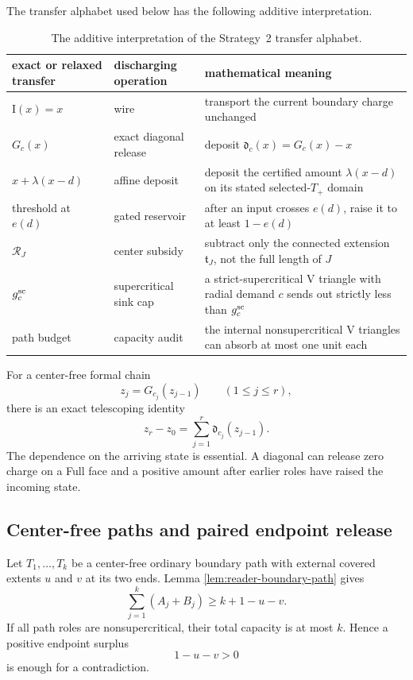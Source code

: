 The transfer alphabet used below has the following additive interpretation.
\begin{table}[H]
\centering
\scriptsize
\renewcommand{\arraystretch}{1.12}
\begin{tabular}{@{}p{}p{}p{}@{}}
\toprule
exact or relaxed transfer&discharging operation&mathematical meaning\\
\midrule
\(\mathrm I(x)=x\)&wire&transport the current boundary charge unchanged\\
\(G_c(x)\)&exact diagonal release&deposit \(\mathfrak d_c(x)=G_c(x)-x\)\\
\(x+\lambda(x-d)\)&affine deposit&deposit the certified amount
\(\lambda(x-d)\) on its stated selected-\(T_+\) domain\\
threshold at \(e(d)\)&gated reservoir&after an input crosses \(e(d)\), raise
it to at least \(1-e(d)\)\\
\(\mathcal R_J\)&center subsidy&subtract only the connected extension
\(\mathfrak t_J\), not the full length of \(J\)\\
\(g_c^{\rm sc}\)&supercritical sink cap&a strict-supercritical V triangle
with radial demand \(c\) sends out strictly less than \(g_c^{\rm sc}\)\\
path budget&capacity audit&the internal nonsupercritical V triangles can
absorb at most one unit each\\
\bottomrule
\end{tabular}
\caption{The additive interpretation of the Strategy~2 transfer alphabet.}
\label{tab:body-discharging-dictionary}
\end{table}

For a center-free formal chain
\[
 z_j=G_{c_j}(z_{j-1})
 \qquad(1\le j\le r),
\]
there is an exact telescoping identity
\begin{equation}
 z_r-z_0
 =\sum_{j=1}^r\mathfrak d_{c_j}(z_{j-1}).
 \label{eq:body-discharge-telescope}
\end{equation}
The dependence on the arriving state is essential.  A diagonal can release
zero charge on a Full face and a positive amount after earlier roles have
raised the incoming state.

\subsection{Center-free paths and paired endpoint release}

Let \(T_1,\ldots,T_k\) be a center-free ordinary boundary path with external
covered extents \(u\) and \(v\) at its two ends.  Lemma
\ref{lem:reader-boundary-path} gives
\[
 \sum_{j=1}^k(A_j+B_j)\ge k+1-u-v.
\]
If all path roles are nonsupercritical, their total capacity is at most
\(k\).  Hence a positive endpoint surplus
\begin{equation}
 1-u-v>0
 \label{eq:body-positive-endpoint-surplus}
\end{equation}
is enough for a contradiction.

